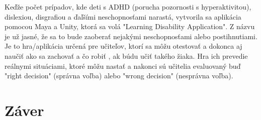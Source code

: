 \documentclass[10pt,oneside,slovak,a4paper]{article}
\begin{document}
Keďže počet prípadov, kde deti s ADHD (porucha pozornosti s hyperaktivitou), dislexiou, disgrafiou a ďaľšími neschopnosťami narastá, vytvorila sa aplikácia pomocou Maya a Unity, ktorá sa volá "Learning Disability Application". Z názvu je už jasné, že sa to bude zaoberať nejakými neschopnosťami alebo postihnutiami. Je to hra/aplikácia určená pre učiteľov, ktorí sa môžu otestovať a dokonca aj naučiť ako sa zachovať a čo robiť , ak búdu učiť takého žiaka. Hra ich prevedie reálnymi situáciami, ktoré môžu nastať a nakonci sú učitelia evaluovaný buď "right decision" (správna voľba) alebo "wrong decision" (nesprávna voľba)\cite{studies}.



\section{Záver} \label{zaver}





\end{document}

